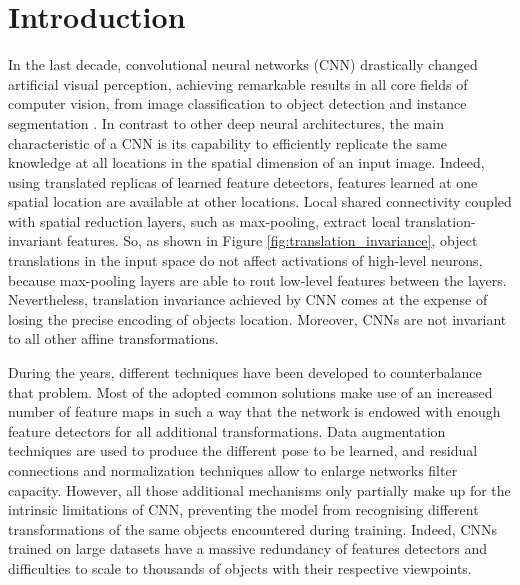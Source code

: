 \documentclass{article}
\begin{document}
\section{Introduction}
In the last decade, convolutional neural networks (CNN) drastically changed artificial visual perception, achieving remarkable results in all core fields of computer vision, from image classification \cite{krizhevsky2017imagenet,he2016deep,hu2018squeeze} to object detection  \cite{redmon2016you,liu2016ssd,mazzia2020real} and instance segmentation \cite{he2017mask}. In contrast to other deep neural architectures, the main characteristic of a CNN is its capability to efficiently replicate the same knowledge at all locations in the spatial dimension of an input image. Indeed, using translated replicas of learned feature detectors, features learned at one spatial location are available at other locations. Local shared connectivity coupled with spatial reduction layers, such as max-pooling, extract local translation-invariant features. So, as shown in Figure \ref{fig:translation_invariance}, object translations in the input space do not affect activations of high-level neurons, because max-pooling layers are able to rout low-level features between the layers. Nevertheless, translation invariance achieved by CNN comes at the expense of losing the precise encoding of objects location. Moreover, CNNs are not invariant to all other affine transformations.

During the years, different techniques have been developed to counterbalance that problem. Most of the adopted common solutions make use of an increased number of feature maps in such a way that the network is endowed with enough feature detectors for all additional transformations. Data augmentation techniques are used to produce the different pose to be learned, and residual connections and normalization techniques allow to enlarge networks filter capacity. However, all those additional mechanisms only partially make up for the intrinsic limitations of CNN, preventing the model from recognising different transformations of the same objects encountered during training. Indeed, CNNs trained on large datasets have a massive redundancy of features detectors and difficulties to scale to thousands of objects with their respective viewpoints.
\end{document}
